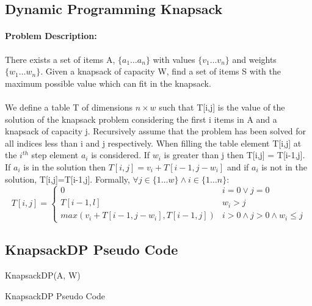 \documentclass[12pt,letterpaper]{article}
\begin{document}
\subsection{Dynamic Programming Knapsack}
\paragraph{Problem Description:} There exists a set of items A, $\{a_1\dots a_n\}$ with values $\{v_1\dots v_n\}$ and weights $\{w_1\dots w_n\}$. Given a knapsack of capacity W, find a set of items S with the maximum possible value which can fit in the knapsack. 
\paragraph{}We define a table T of dimensions $n\times w$ such that T[i,j] is the value of the solution of the knapsack problem considering the first i items in A and a knapsack of capacity j. Recursively assume that the problem has been solved for all indices less than i and j respectively. When filling the table element T[i,j] at the $i^{th}$ step element $a_i$ is considered. If $w_i$ is greater than j then T[i,j] = T[i-1,j]. If $a_i$ is in the solution then $T[i,j]=v_i+T[i-1,j-w_i]$ and if $a_i$ is not in the solution, T[i,j]=T[i-1,j]. Formally, $\forall j \in \{1\dots w\} \wedge i \in \{1\dots n\}$:
\[T[i,j]=\begin{cases} 0 & i=0 \vee j=0 \\ T[i-1,l] & w_i>j \\ max(v_i+T[i-1,j-w_i],T[i-1,j]) & i>0 \wedge j>0 \wedge w_i\leq j \end{cases}\]
\subsection{KnapsackDP Pseudo Code}
\begin{algorithm}[h]
KnapsackDP(A, W)
\caption{KnapsackDP Pseudo Code}
\label{KnapsackDP}
\end{algorithm}
\FloatBarrier
\end{document}
